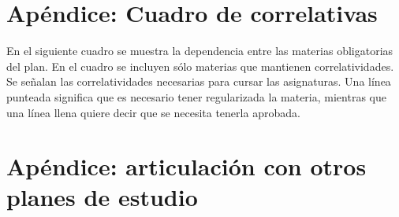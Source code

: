 \documentclass[a4paper, 12pt]{article}
\begin{document}
 

\newpage
\appendix

\section{Apéndice: Cuadro de correlativas}
En el siguiente cuadro se muestra la dependencia entre las materias obligatorias del plan. En el cuadro se incluyen sólo
materias que mantienen correlatividades. Se señalan las correlatividades necesarias para cursar las asignaturas. Una línea punteada significa que es necesario tener regularizada la materia, mientras que una línea llena quiere decir que se necesita tenerla aprobada.   

\begin{figure}[h]

\end{figure}


\newpage

\section{Apéndice: articulación con otros planes de estudio}
\end{document}
